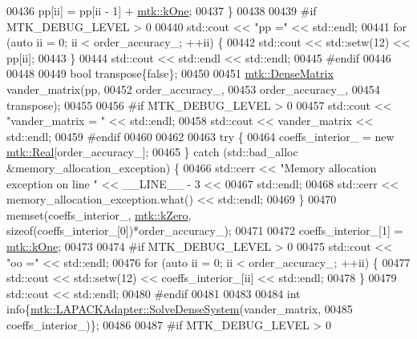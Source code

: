 \begin{DoxyCode}
{{00436     pp[ii] = pp[ii - 1] + \hyperlink{group__c01-roots_ga26407c24d43b6b95480943340d285c71}{mtk::kOne};
00437   \}
00438 
00439 \textcolor{preprocessor}{  #if MTK\_DEBUG\_LEVEL > 0}
00440   std::cout << \textcolor{stringliteral}{"pp ="} << std::endl;
00441   \textcolor{keywordflow}{for} (\textcolor{keyword}{auto} ii = 0; ii < order\_accuracy\_; ++ii) \{
00442     std::cout << std::setw(12) << pp[ii];
00443   \}
00444   std::cout << std::endl << std::endl;
00445 \textcolor{preprocessor}{  #endif}
00446 
00448 
00449   \textcolor{keywordtype}{bool} transpose\{\textcolor{keyword}{false}\};
00450 
00451   \hyperlink{classmtk_1_1DenseMatrix}{mtk::DenseMatrix} vander\_matrix(pp,
00452                                  order\_accuracy\_,
00453                                  order\_accuracy\_,
00454                                  transpose);
00455 
00456 \textcolor{preprocessor}{  #if MTK\_DEBUG\_LEVEL > 0}
00457   std::cout << \textcolor{stringliteral}{"vander\_matrix = "} << std::endl;
00458   std::cout << vander\_matrix << std::endl;
00459 \textcolor{preprocessor}{  #endif}
00460 
00462 
00463   \textcolor{keywordflow}{try} \{
00464     coeffs\_interior\_ = \textcolor{keyword}{new} \hyperlink{group__c01-roots_gac080bbbf5cbb5502c9f00405f894857d}{mtk::Real}[order\_accuracy\_];
00465   \} \textcolor{keywordflow}{catch} (std::bad\_alloc &memory\_allocation\_exception) \{
00466     std::cerr << \textcolor{stringliteral}{"Memory allocation exception on line "} << \_\_LINE\_\_ - 3 <<
00467       std::endl;
00468     std::cerr << memory\_allocation\_exception.what() << std::endl;
00469   \}
00470   memset(coeffs\_interior\_, \hyperlink{group__c01-roots_ga59a451a5fae30d59649bcda274fea271}{mtk::kZero}, \textcolor{keyword}{sizeof}(coeffs\_interior\_[0])*order\_accuracy\_);
00471 
00472   coeffs\_interior\_[1] = \hyperlink{group__c01-roots_ga26407c24d43b6b95480943340d285c71}{mtk::kOne};
00473 
00474 \textcolor{preprocessor}{  #if MTK\_DEBUG\_LEVEL > 0}
00475   std::cout << \textcolor{stringliteral}{"oo ="} << std::endl;
00476   \textcolor{keywordflow}{for} (\textcolor{keyword}{auto} ii = 0; ii < order\_accuracy\_; ++ii) \{
00477     std::cout << std::setw(12) << coeffs\_interior\_[ii] << std::endl;
00478   \}
00479   std::cout << std::endl;
00480 \textcolor{preprocessor}{  #endif}
00481 
00483 
00484   \textcolor{keywordtype}{int} info\{\hyperlink{classmtk_1_1LAPACKAdapter_a7428bccf74fd4a4af68fb7233846da22}{mtk::LAPACKAdapter::SolveDenseSystem}(vander\_matrix,
00485                                                 coeffs\_interior\_)\};
00486 
00487 \textcolor{preprocessor}{  #if MTK\_DEBUG\_LEVEL > 0}
}}
\end{DoxyCode}
